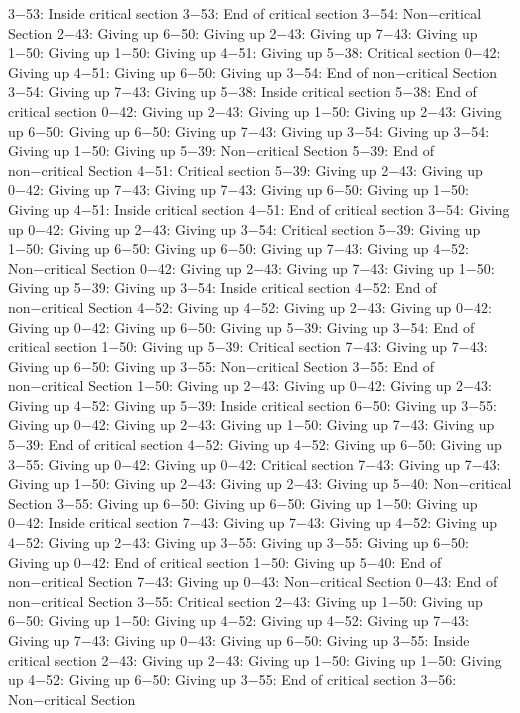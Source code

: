 3−53: Inside critical section
3−53: End of critical section
3−54: Non−critical Section
2−43: Giving up
6−50: Giving up
2−43: Giving up
7−43: Giving up
1−50: Giving up
1−50: Giving up
4−51: Giving up
5−38: Critical section
0−42: Giving up
4−51: Giving up
6−50: Giving up
3−54: End of non−critical Section
3−54: Giving up
7−43: Giving up
5−38: Inside critical section
5−38: End of critical section
0−42: Giving up
2−43: Giving up
1−50: Giving up
2−43: Giving up
6−50: Giving up
6−50: Giving up
7−43: Giving up
3−54: Giving up
3−54: Giving up
1−50: Giving up
5−39: Non−critical Section
5−39: End of non−critical Section
4−51: Critical section
5−39: Giving up
2−43: Giving up
0−42: Giving up
7−43: Giving up
7−43: Giving up
6−50: Giving up
1−50: Giving up
4−51: Inside critical section
4−51: End of critical section
3−54: Giving up
0−42: Giving up
2−43: Giving up
3−54: Critical section
5−39: Giving up
1−50: Giving up
6−50: Giving up
6−50: Giving up
7−43: Giving up
4−52: Non−critical Section
0−42: Giving up
2−43: Giving up
7−43: Giving up
1−50: Giving up
5−39: Giving up
3−54: Inside critical section
4−52: End of non−critical Section
4−52: Giving up
4−52: Giving up
2−43: Giving up
0−42: Giving up
0−42: Giving up
6−50: Giving up
5−39: Giving up
3−54: End of critical section
1−50: Giving up
5−39: Critical section
7−43: Giving up
7−43: Giving up
6−50: Giving up
3−55: Non−critical Section
3−55: End of non−critical Section
1−50: Giving up
2−43: Giving up
0−42: Giving up
2−43: Giving up
4−52: Giving up
5−39: Inside critical section
6−50: Giving up
3−55: Giving up
0−42: Giving up
2−43: Giving up
1−50: Giving up
7−43: Giving up
5−39: End of critical section
4−52: Giving up
4−52: Giving up
6−50: Giving up
3−55: Giving up
0−42: Giving up
0−42: Critical section
7−43: Giving up
7−43: Giving up
1−50: Giving up
2−43: Giving up
2−43: Giving up
5−40: Non−critical Section
3−55: Giving up
6−50: Giving up
6−50: Giving up
1−50: Giving up
0−42: Inside critical section
7−43: Giving up
7−43: Giving up
4−52: Giving up
4−52: Giving up
2−43: Giving up
3−55: Giving up
3−55: Giving up
6−50: Giving up
0−42: End of critical section
1−50: Giving up
5−40: End of non−critical Section
7−43: Giving up
0−43: Non−critical Section
0−43: End of non−critical Section
3−55: Critical section
2−43: Giving up
1−50: Giving up
6−50: Giving up
1−50: Giving up
4−52: Giving up
4−52: Giving up
7−43: Giving up
7−43: Giving up
0−43: Giving up
6−50: Giving up
3−55: Inside critical section
2−43: Giving up
2−43: Giving up
1−50: Giving up
1−50: Giving up
4−52: Giving up
6−50: Giving up
3−55: End of critical section
3−56: Non−critical Section

